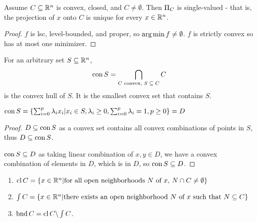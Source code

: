 \begin{thm}
  \label{sec:convexity-13}
  Assume $C \subseteq \mathbb{R}^{n}$ is convex, closed, and $C \neq
  \emptyset$.  Then $\operatorname*{\Pi}_{C}$ is single-valued - that is, the
  projection of $x$ onto $C$ is unique for every $x \in \mathbb{R}^{n}$.
\end{thm}

\begin{proof}
  $f$ is lsc, level-bounded, and proper, so $\operatorname*{arg\,min} f \neq
  \emptyset$.  $f$ is strictly convex so has at most one minimizer.
\end{proof}

\begin{defn}
  \label{sec:convexity-14}
  For an arbitrary set $S \subseteq \mathbb{R}^{n}$,
  \begin{equation}
    \label{eq:10}
    \operatorname*{con} S = \bigcap_{\text{$C$ convex, $S \subseteq C$}} C
  \end{equation}
  is the convex hull of $S$.  It is the smallest convex set that
  contains $S$.
\end{defn}

\begin{thm}
  \label{sec:convexity-15}
  $\operatorname*{con} S = \{ \sum_{i=0}^{p} \lambda_{i} x_{i} | x_{i} \in S,
  \lambda_{i} \geq 0, \sum_{i=0}^{p} \lambda_{i} = 1, p \geq 0  \} = D$
\end{thm}

\begin{proof}
  $D \subseteq \operatorname*{con} S$ as a convex set contains all convex
  combinations of points in $S$, thus $D \subseteq \operatorname*{con} S$.

  $\operatorname*{con} S \subseteq D$ as taking linear combination of $x, y \in D$,
  we have a convex combination of elements in $D$, which is in $D$, so
  $\operatorname*{con} S \subseteq D$.

\end{proof}

\begin{thm}
  \label{sec:convexity-16}
  \begin{enumerate}
  \item $\operatorname*{cl} C = \{ x \in \mathbb{R}^{n} | \text{for all open neighborhoods
      $N$ of $x$, $N \cap C \neq \emptyset$} \}$
  \item $\int C = \{ x \in \mathbb{R}^{n} | \text{there exists an open
      neighborhood $N$ of $x$ such that $N \subseteq C$} \} $
  \item $\operatorname*{bnd} C = \operatorname*{cl} C \backslash \int C$.
  \end{enumerate}
\end{thm}

